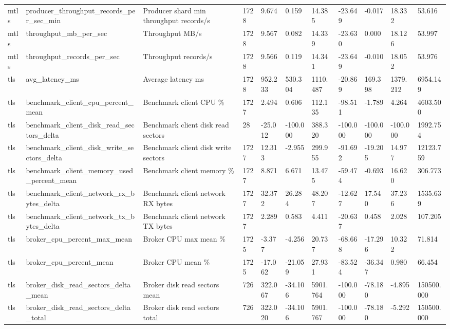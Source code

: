\begin{longtable}{lllllllllll}
mtls & producer\_throughput\_records\_per\_sec\_min & Producer shard min throughput records/s & 1728 & 9.674 & 0.159 & 14.385 & -23.649 & -0.017 & 18.332 & 53.616 \\
mtls & throughput\_mb\_per\_sec & Throughput MB/s & 1728 & 9.567 & 0.082 & 14.339 & -23.630 & 0.000 & 18.126 & 53.997 \\
mtls & throughput\_records\_per\_sec & Throughput records/s & 1728 & 9.566 & 0.119 & 14.341 & -23.649 & -0.010 & 18.052 & 53.976 \\
tls & avg\_latency\_ms & Average latency ms & 1728 & 952.233 & 530.304 & 1110.487 & -20.869 & 169.398 & 1379.212 & 6954.149 \\
tls & benchmark\_client\_cpu\_percent\_mean & Benchmark client CPU \% & 1727 & 2.494 & 0.606 & 112.135 & -98.511 & -1.789 & 4.264 & 4603.500 \\
tls & benchmark\_client\_disk\_read\_sectors\_delta & Benchmark client disk read sectors & 28 & -25.012 & -100.000 & 388.320 & -100.000 & -100.000 & -100.000 & 1992.754 \\
tls & benchmark\_client\_disk\_write\_sectors\_delta & Benchmark client disk write sectors & 1727 & 12.313 & -2.955 & 299.955 & -91.692 & -19.205 & 14.977 & 12123.759 \\
tls & benchmark\_client\_memory\_used\_percent\_mean & Benchmark client memory \% & 1727 & 8.871 & 6.671 & 13.475 & -59.474 & -0.693 & 16.620 & 306.773 \\
tls & benchmark\_client\_network\_rx\_bytes\_delta & Benchmark client network RX bytes & 1727 & 32.372 & 26.284 & 48.207 & -12.627 & 17.540 & 37.236 & 1535.639 \\
tls & benchmark\_client\_network\_tx\_bytes\_delta & Benchmark client network TX bytes & 1727 & 2.289 & 0.583 & 4.411 & -20.637 & 0.458 & 2.028 & 107.205 \\
tls & broker\_cpu\_percent\_max\_mean & Broker CPU max mean \% & 1725 & -3.377 & -4.256 & 20.737 & -68.668 & -17.296 & 10.322 & 71.814 \\
tls & broker\_cpu\_percent\_mean & Broker CPU mean \% & 1725 & -17.062 & -21.059 & 27.931 & -83.524 & -36.347 & 0.980 & 66.454 \\
tls & broker\_disk\_read\_sectors\_delta\_mean & Broker disk read sectors mean & 726 & 322.067 & -34.106 & 5901.764 & -100.000 & -78.180 & -4.895 & 150500.000 \\
tls & broker\_disk\_read\_sectors\_delta\_total & Broker disk read sectors total & 726 & 322.020 & -34.106 & 5901.767 & -100.000 & -78.180 & -5.292 & 150500.000 \\

\end{longtable}
